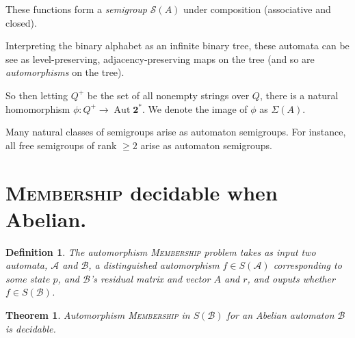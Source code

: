 \documentclass[a0]{a0poster}
\newcommand{\decprob}[1]{\textsc{#1}}
\newcommand{\Z}{\mathbb{Z}}
\newcommand{\A}{\mathcal{A}}
\newcommand{\B}{\mathcal{B}}
\theoremstyle{pleasant}
\newtheorem{theorem}{Theorem}
\newtheorem{definition}{Definition}
\newenvironment{proofsketch}{\paragraph{\large \normalfont \textit{Proof Sketch:}}}{\hfill$\square$}
\newcommand{\0}{\underline{0}}
\newcommand{\1}{\underline{1}}
\newcommand{\2}{\underline{2}}
\renewcommand{\S}{\mathcal{S}}
\begin{document}
\begin{multicols}{3}
These functions form a \emph{semigroup} $\S(A)$ under composition
(associative and closed).

Interpreting the binary alphabet as an infinite binary tree, these
automata can be see as level-preserving, adjacency-preserving maps on
the tree (and so are \emph{automorphisms} on the tree).


So then letting $Q^+$ be the set of all nonempty strings over $Q$,
there is a natural homomorphism
$\phi : Q^+ \rightarrow \operatorname{Aut}\textbf{2}^*$. We denote the
image of $\phi$ as $\Sigma(A)$.


Many natural classes of semigroups arise as automaton semigroups. For
instance, all free semigroups of rank $\geq 2$ arise as automaton
semigroups.

\section*{\decprob{Membership} decidable when Abelian.}

\begin{definition}
  The automorphism \decprob{Membership} problem takes as input two
  automata, $\A$ and $\B$, a distinguished automorphism $f \in S(\A)$
  corresponding to some state $p$, and $\B$'s residual matrix and
  vector $A$ and $r$, and ouputs whether $f \in S(\B)$.
\end{definition}

\begin{theorem}
  Automorphism \decprob{Membership} in $S(\B)$ for an Abelian
  automaton $\B$ is decidable.
\end{theorem}



\end{multicols}
\end{document}
